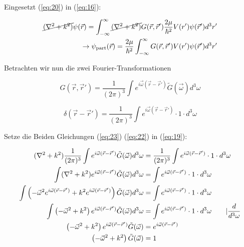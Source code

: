 Eingesetzt (\ref{eq:20})  in (\ref{eq:16}):

\begin{align}
  \label{eq:21}
   \cancel{(\nabla^2 + k^2)}\psi(\vec r) = \int_{-\infty}^\infty \cancel{(\nabla^2 + k^2)} G(\vec r,\vec r')\frac{2\mu}{\hbar^2}V(r')\psi(\vec r') d^3 r'\notag \\
\rightarrow  \psi_{\text{part}}(\vec r) = \frac{2\mu}{\hbar^2} \int_{-\infty}^\infty  G(\vec r,\vec r')V(r')\psi(\vec r') d^3 r' 
\end{align}


Betrachten wir nun die zwei Fourier-Transformationen

\begin{equation}
  \label{eq:22}
  G(\vec r ,\vec r') = \frac{1}{(2\pi)^3}\int e^{i\vec \omega (\vec r -\vec r') }\tilde G (\vec \omega)d^3 \omega
\end{equation}

\begin{equation}
  \label{eq:23}
  \delta(\vec r - \vec r') =  \frac{1}{(2\pi)^3}\int e^{i\vec \omega (\vec r -\vec r') }\cdot 1\cdot d^3 \omega
\end{equation}


Setze die Beiden Gleichungen (\ref{eq:23}) (\ref{eq:22}) in (\ref{eq:19}):

\begin{align}
  \label{eq:24}
   (\nabla^2 + k^2)\frac{1}{(2\pi)^3}\int e^{i\vec \omega (\vec r -\vec r') }\tilde G (\vec \omega)d^3 \omega  &=  \frac{1}{(2\pi)^3}\int e^{i\vec \omega (\vec r -\vec r') }\cdot 1\cdot d^3 \omega\notag \\
\int (\nabla^2 + k^2) e^{i\vec \omega (\vec r -\vec r') }\tilde G (\vec \omega)d^3 \omega  &=  \int e^{i\vec \omega (\vec r -\vec r') }\cdot 1\cdot d^3 \omega\notag \\
\int \left( -\vec \omega^2 e^{i\vec \omega (\vec r -\vec r') }+ k^2 e^{i\vec \omega (\vec r -\vec r') } \right) \tilde G (\vec \omega)d^3 \omega   &=  \int e^{i\vec \omega (\vec r -\vec r') }\cdot 1\cdot d^3 \omega\notag \\
\int \left( -\vec \omega^2 + k^2  \right)e^{i\vec \omega (\vec r -\vec r') } \tilde G (\vec \omega)d^3 \omega   &=  \int e^{i\vec \omega (\vec r -\vec r') }\cdot 1\cdot d^3 \omega \qquad | \frac{d}{d^3\omega}\notag \\
\left( -\vec \omega^2 + k^2  \right)e^{i\vec \omega (\vec r -\vec r') } \tilde G (\vec \omega)   &=  e^{i\vec \omega (\vec r -\vec r') }\notag \\
\left( -\vec \omega^2 + k^2  \right) \tilde G (\vec \omega)   &=  1 
\end{align}

